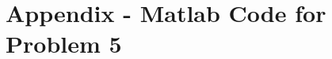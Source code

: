 



\newpage
\section{Appendix - Matlab Code for Problem 5}
\label{appendix:problem5}



















































